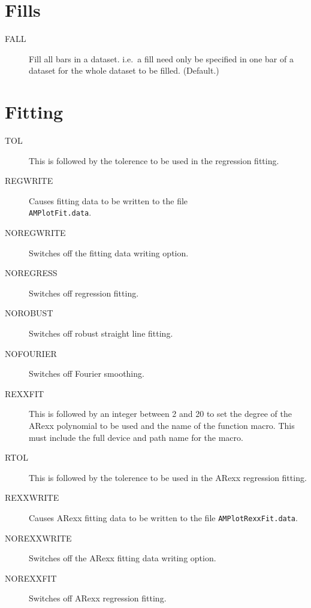 \section{Fills}
\begin{description}
\item[FALL\dag] Fill all bars in a dataset. i.e.\ a fill need only be specified in one 
bar of a dataset for the whole dataset to be filled. (Default.)
\end{description}

\section{Fitting}
\begin{description}
\item[TOL] This is followed by the tolerence to be used in the regression fitting.
\item[REGWRITE] Causes fitting data to be written to the file\\
{\tt AMPlotFit.data}.
\item[NOREGWRITE\dag] Switches off the fitting data writing option.
\item[NOREGRESS\dag] Switches off regression fitting.
\item[NOROBUST\dag] Switches off robust straight line fitting.
\item[NOFOURIER\dag] Switches off Fourier smoothing.
\item[REXXFIT] This is followed by an integer between 2 and 20 to set the degree 
of the ARexx polynomial to be used and the name of the function macro. This must 
include the full device and path name for the macro.
\item[RTOL] This is followed by the tolerence to be used in the ARexx regression 
fitting.
\item[REXXWRITE] Causes ARexx fitting data to be written to the file 
{\tt AMPlotRexxFit.data}.
\item[NOREXXWRITE\dag] Switches off the ARexx fitting data writing option.
\item[NOREXXFIT\dag] Switches off ARexx regression fitting.
\end{description}

